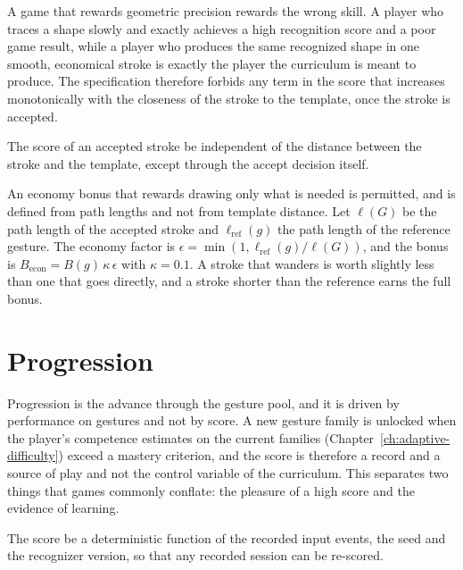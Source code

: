 A game that rewards geometric precision rewards the wrong skill. A player who traces a shape slowly and exactly achieves a high recognition score and a poor game result, while a player who produces the same recognized shape in one smooth, economical stroke is exactly the player the curriculum is meant to produce. The specification therefore forbids any term in the score that increases monotonically with the closeness of the stroke to the template, once the stroke is accepted.

\begin{requirement}\label{req:precision}
The score of an accepted stroke \must{} be independent of the distance between the stroke and the template, except through the accept decision itself.\evS
\end{requirement}

An economy bonus that rewards drawing only what is needed is permitted, and is defined from path lengths and not from template distance. Let $\ell(G)$ be the path length of the accepted stroke and $\ell_{\mathrm{ref}}(g)$ the path length of the reference gesture. The economy factor is $\epsilon=\min(1,\ell_{\mathrm{ref}}(g)/\ell(G))$, and the bonus is $B_{\mathrm{econ}}=B(g)\,\kappa\,\epsilon$ with $\kappa=0.1$. A stroke that wanders is worth slightly less than one that goes directly, and a stroke shorter than the reference earns the full bonus.

\section{Progression}

Progression is the advance through the gesture pool, and it is driven by performance on gestures and not by score. A new gesture family is unlocked when the player's competence estimates on the current families (Chapter~\ref{ch:adaptive-difficulty}) exceed a mastery criterion, and the score is therefore a record and a source of play and not the control variable of the curriculum. This separates two things that games commonly conflate: the pleasure of a high score and the evidence of learning.

\begin{requirement}\label{req:replay-score}
The score \must{} be a deterministic function of the recorded input events, the seed and the recognizer version, so that any recorded session can be re-scored.\evS
\end{requirement}

